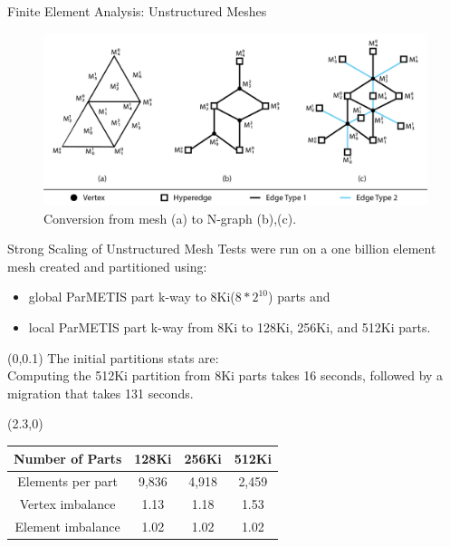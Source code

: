 \documentclass{beamer}
\begin{document}
\begin{textblock}{15.6}
\begin{textblock}{5}
\begin{block}{\centering Finite Element Analysis: Unstructured Meshes}
\begin{itemize}
      \end{itemize}
      \begin{figure}
        \centering
        \includegraphics[width=.7\textwidth]{../figures/exampleMesh2Graph_backgroundless.png}
        \caption{Conversion from mesh (a) to N-graph (b),(c).}
      \end{figure}
    \end{block}
    \begin{block}{\centering Strong Scaling of Unstructured Mesh}
      Tests were run on a one billion element mesh created and partitioned using:
      \begin{itemize}
      \item global ParMETIS part k-way to 8Ki($8*2^{10}$) parts and
      \item local ParMETIS part k-way from 8Ki to 128Ki, 256Ki, and 512Ki parts.
      \end{itemize}
      \begin{textblock}{2.3}(0,0.1)
        The initial partitions stats are: \\[1cm]

        Computing the 512Ki partition from 8Ki parts takes 16 seconds, followed by a migration that takes 131 seconds.
        
      \end{textblock}
      \begin{textblock}{2.5}(2.3,0)
      \begin{table}[!h]
        \centering
        \begin{tabular}{||c|c|c|c||}
          \hline
          Number of Parts &128Ki&256Ki&512Ki \\
          \hline
          Elements per part & 9,836 & 4,918&2,459  \\
          \hline
          Vertex imbalance & 1.13 & 1.18 & 1.53 \\
          \hline
          Element imbalance & 1.02& 1.02& 1.02\\
          \hline
        \end{tabular}
      \end{table}
      \end{textblock}
      \vspace{10cm}


\end{block}
\end{textblock}
\end{textblock}
\end{document}
